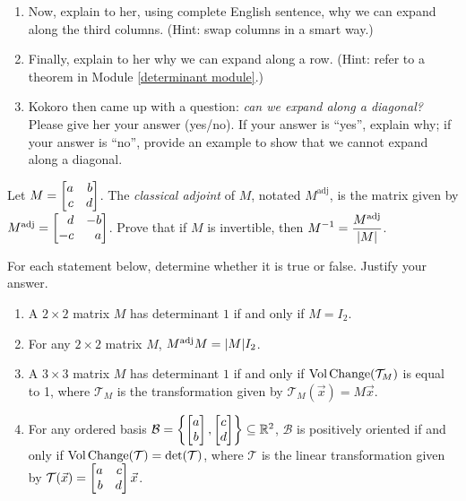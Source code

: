 \begin{exercises}
\begin{problist}
\begin{enumerate}
			\item Now, explain to her, using complete English sentence, why we
				can expand along the third columns. (Hint: swap columns in a smart
				way.)

			\item Finally, explain to her why we can expand along a row. (Hint: refer
				to a theorem in Module \ref{determinant module}.)

            \item Kokoro then came up with a question: \emph{can we expand along a diagonal?}
            Please give her your answer (yes/no). If your answer is ``yes'', explain why; if your
            answer is ``no'', provide an example to show that we cannot expand along a diagonal.
		\end{enumerate}
        \prob Let $M=\mat{a & b \\ c & d}$. The \emph{classical adjoint} of $M$, notated
        $M^{\text{adj}}$, is the matrix given by $M^{\text{adj}}=\mat{d & -b \\ -c & a}$. Prove that if $M$ is invertible, then $\displaystyle M^{-1}=\frac{M^{\text{adj}}}{\lvert M\rvert}$.
		
		\prob For each statement below, determine whether it is true or
           false. Justify your answer.
         \begin{enumerate}
           \item A $2\times 2$ matrix $M$ has determinant $1$ if and only if $M=I_2$.
           \item For any $2\times 2$ matrix $M$, $M^{\text{adj}}M=\lvert M\rvert I_2$.
           \item A $3\times 3$ matrix $M$ has determinant $1$ if and only if $\operatorname{Vol\hspace{1.5pt}Change}(\mathcal{T}_{M})$ is equal to 1, where $\mathcal{T}_M$ is the transformation given by $\mathcal{T}_M(\vec x)=M\vec x$.
           \item For any ordered basis $\mathcal{B}=\left\{\begin{bmatrix}a \\ b\end{bmatrix},\begin{bmatrix}c \\ d\end{bmatrix}\right\}\subseteq \mathbb{R}^2$,
           $\mathcal{B}$ is positively oriented if and only if $\operatorname{Vol\hspace{1.5pt}Change}(\mathcal{T})=\det(\mathcal{T})$, where $\mathcal{T}$ is the linear transformation given by $\mathcal{T}(\vec x)=\mat{a & c \\ b & d}\vec x$.
         \end{enumerate}
	\end{problist}
\end{exercises} 